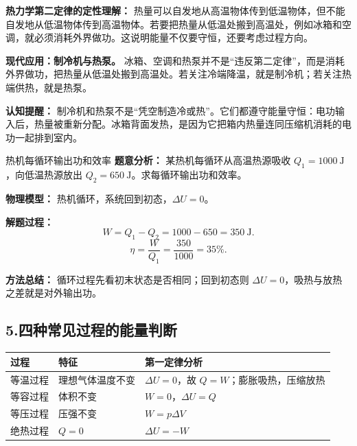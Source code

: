\textbf{热力学第二定律的定性理解：} 热量可以自发地从高温物体传到低温物体，但不能自发地从低温物体传到高温物体。若要把热量从低温处搬到高温处，例如冰箱和空调，就必须消耗外界做功。这说明能量不仅要守恒，还要考虑过程方向。

\begin{center}


\label{fig:second-law-heat-flow}
\end{center}

\textbf{现代应用：制冷机与热泵。} 冰箱、空调和热泵并不是“违反第二定律”，而是消耗外界做功，把热量从低温处搬到高温处。若关注冷端降温，就是制冷机；若关注热端供热，就是热泵。

\begin{center}


\label{fig:refrigerator-heat-pump}
\end{center}

\textbf{认知提醒：} 制冷机和热泵不是“凭空制造冷或热”。它们都遵守能量守恒：电功输入后，热量被重新分配。冰箱背面发热，是因为它把箱内热量连同压缩机消耗的电功一起排到室内。

\begin{examplebox}{热机每循环输出功和效率}
\textbf{题意分析：} 某热机每循环从高温热源吸收 $Q_1=1000\ \mathrm{J}$，向低温热源放出 $Q_2=650\ \mathrm{J}$。求每循环输出功和效率。

\textbf{物理模型：} 热机循环，系统回到初态，$\Delta U=0$。

\begin{center}

\end{center}

\textbf{解题过程：}
\[
W=Q_1-Q_2=1000-650=350\ \mathrm{J}.
\]
\[
\eta=\frac{W}{Q_1}=\frac{350}{1000}=35\%.
\]

\textbf{方法总结：} 循环过程先看初末状态是否相同；回到初态则 $\Delta U=0$，吸热与放热之差就是对外输出功。
\end{examplebox}

\subsection*{5.\quad 四种常见过程的能量判断}

\begin{center}
\begin{tabular}{lll}
\toprule
过程 & 特征 & 第一定律分析 \\
\midrule
等温过程 & 理想气体温度不变 & $\Delta U=0$，故 $Q=W$；膨胀吸热，压缩放热 \\
等容过程 & 体积不变 & $W=0$，$\Delta U=Q$ \\
等压过程 & 压强不变 & $W=p\Delta V$ \\
绝热过程 & $Q=0$ & $\Delta U=-W$ \\
\bottomrule
\end{tabular}
\end{center}

